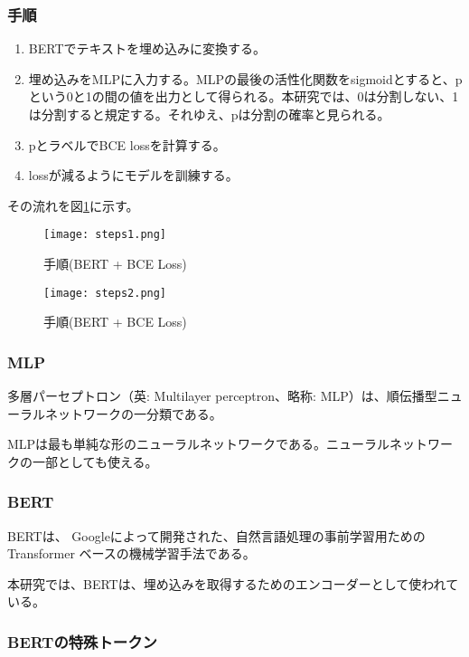 \documentclass[
  platex, dvipdfmx,  %
]{nlp2021}
\begin{document}
\subsubsection{手順}

\begin{enumerate}
  \item BERTでテキストを埋め込みに変換する。
  \item 埋め込みをMLPに入力する。MLPの最後の活性化関数をsigmoidとすると、pという0と1の間の値を出力として得られる。本研究では、0は分割しない、1は分割すると規定する。それゆえ、pは分割の確率と見られる。
  \item pとラベルでBCE lossを計算する。
  \item lossが減るようにモデルを訓練する。
\end{enumerate}

その流れを図\ref{fig:steps1}に示す。

\begin{figure}[t]
  \centering
  \texttt{[image: steps1.png]}
  \caption{手順(BERT + BCE Loss)}
  \label{fig:steps1}
  \end{figure}


\begin{figure*}[t]
  \centering
  \texttt{[image: steps2.png]}
  \caption{手順(BERT + BCE Loss)}
  \label{fig:steps2}
  \end{figure*}

\subsubsection{MLP}

多層パーセプトロン（英: Multilayer perceptron、略称: MLP）は、順伝播型ニューラルネットワークの一分類である。

MLPは最も単純な形のニューラルネットワークである。ニューラルネットワークの一部としても使える。

\subsubsection{BERT}

BERTは、 Googleによって開発された、自然言語処理の事前学習用ための Transformer ベースの機械学習手法である。

本研究では、BERTは、埋め込みを取得するためのエンコーダーとして使われている。

\subsubsection{BERTの特殊トークン}
\end{document}
